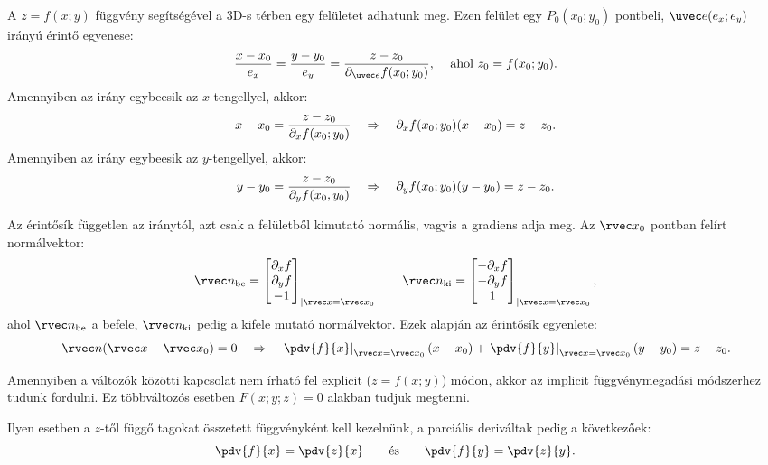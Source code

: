 \documentclass[a4paper, 12pt, fleqn]{scrartcl}
\begin{document}
\begin{blueBox}

  A $z = f(x; y)$ függvény segítségével a 3D-s térben egy felületet adhatunk
  meg. Ezen felület egy $P_0(x_0; y_0)$ pontbeli, $\uvec e(e_x; e_y)$ irányú
  érintő egyenese:
  $$
    \frac{x - x_0}{e_x}
    = \frac{y - y_0}{e_y}
    = \frac{z - z_0}{\partial_{\uvec e}f(x_0; y_0)}
    \text{, \quad ahol $z_0 = f(x_0; y_0)$.}
  $$
  Amennyiben az irány egybeesik az $x$-tengellyel, akkor:
  $$
    x - x_0 = \frac{z - z_0}{\partial_x f(x_0; y_0)}
    \quad \Rightarrow \quad
    \partial_x f(x_0; y_0) (x - x_0) = z - z_0
    \text.
  $$
  Amennyiben az irány egybeesik az $y$-tengellyel, akkor:
  $$
    y - y_0 = \frac{z - z_0}{\partial_y f(x_0, y_0)}
    \quad \Rightarrow \quad
    \partial_y f(x_0; y_0) (y - y_0) = z - z_0
    \text.
  $$
\end{blueBox}

\begin{blueBox}

  Az érintősík független az iránytól, azt csak a felületből kimutató normális,
  vagyis a gradiens adja meg. Az $\rvec x_0$ pontban felírt normálvektor:
  $$
    \rvec n_{\text{be}} = \begin{bmatrix}
      \partial_x f \\
      \partial_y f \\
      -1
    \end{bmatrix}_{|\rvec x = \rvec x_0}
    \qquad
    \rvec n_{\text{ki}} = \begin{bmatrix}
      -\partial_x f \\
      -\partial_y f \\
      1
    \end{bmatrix}_{|\rvec x = \rvec x_0}
    \text,
  $$
  ahol $\rvec n_{\text{be}}$ a befele, $\rvec n_{\text{ki}}$ pedig a kifele
  mutató normálvektor. Ezek alapján az érintősík egyenlete:
  $$
    \rvec n (\rvec x - \rvec x_0) = 0
    \quad \Rightarrow \quad
    \left.\pdv{f}{x}\right|_{\rvec x = \rvec x_0} (x - x_0)
    + \left.\pdv{f}{y}\right|_{\rvec x = \rvec x_0} (y - y_0)
    = z - z_0
    \text.
  $$
\end{blueBox}

\begin{blueBox}

  Amennyiben a változók közötti kapcsolat nem írható fel explicit
  ($z = f(x; y)$) módon, akkor az implicit függvénymegadási módszerhez tudunk
  fordulni. Ez többváltozós esetben $F(x; y; z) = 0$ alakban tudjuk megtenni.

  Ilyen esetben a $z$-től függő tagokat összetett függvényként kell kezelnünk,
  a parciális deriváltak pedig a következőek:
  $$
    \pdv{f}{x} = \pdv{z}{x}
    \qquad \text{és} \qquad
    \pdv{f}{y} = \pdv{z}{y}
    \text.
  $$
\end{blueBox}
\end{document}
